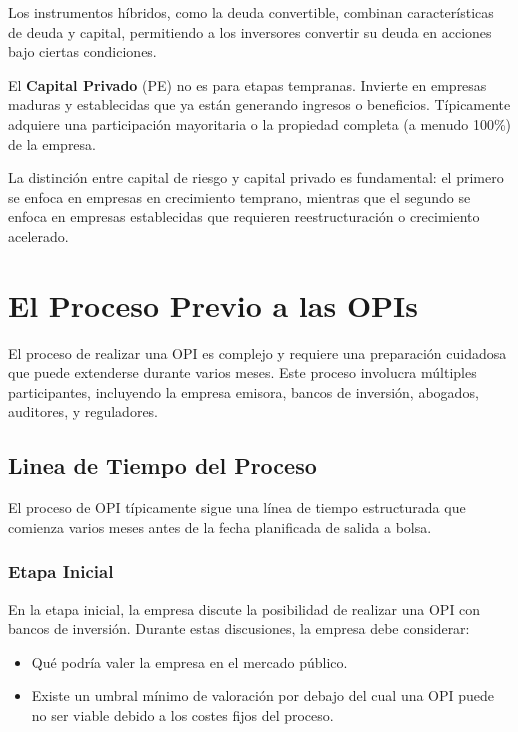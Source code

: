 Los instrumentos híbridos, como la deuda convertible, combinan características de deuda y capital, permitiendo a los inversores convertir su deuda en acciones bajo ciertas condiciones.

\begin{definicion}
El \textbf{Capital Privado} (PE) no es para etapas tempranas. Invierte en empresas maduras y establecidas que ya están generando ingresos o beneficios. Típicamente adquiere una participación mayoritaria o la propiedad completa (a menudo 100\%) de la empresa.
\end{definicion}

La distinción entre capital de riesgo y capital privado es fundamental: el primero se enfoca en empresas en crecimiento temprano, mientras que el segundo se enfoca en empresas establecidas que requieren reestructuración o crecimiento acelerado.

\section{El Proceso Previo a las OPIs}

El proceso de realizar una OPI es complejo y requiere una preparación cuidadosa que puede extenderse durante varios meses. Este proceso involucra múltiples participantes, incluyendo la empresa emisora, bancos de inversión, abogados, auditores, y reguladores.

\subsection{Linea de Tiempo del Proceso}

El proceso de OPI típicamente sigue una línea de tiempo estructurada que comienza varios meses antes de la fecha planificada de salida a bolsa.

\subsubsection{Etapa Inicial}

En la etapa inicial, la empresa discute la posibilidad de realizar una OPI con bancos de inversión. Durante estas discusiones, la empresa debe considerar:

\begin{itemize}
\item Qué podría valer la empresa en el mercado público.
\item Existe un umbral mínimo de valoración por debajo del cual una OPI puede no ser viable debido a los costes fijos del proceso.
\end{itemize}

